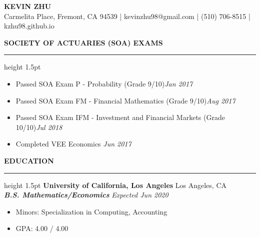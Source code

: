 \documentclass[11pt,letterpaper]{article}
\newcommand{\sectline}{\vspace{3pt}\hrule height 1.5pt\vspace{3pt}}
\newcommand{\sectspace}{\vspace{7pt}}
\begin{document}
\centering
{\fontsize{13pt}{13pt}\selectfont \textbf{KEVIN ZHU}} \vspace{2pt} \\
{\fontsize{11pt}{13pt} Carmelita Place, Fremont, CA 94539 | kevinzhu98@gmail.com | (510) 706-8515 | kzhu98.github.io}
\sectspace

\fontsize{11pt}{13pt}\selectfont
\raggedright
\textbf{SOCIETY OF ACTUARIES (SOA) EXAMS}\sectline
\begin{itemize}
	\item Passed SOA Exam P - Probability (Grade 9/10)\hfill \textit{Jan 2017}
	\item Passed SOA Exam FM - Financial Mathematics (Grade 9/10)\hfill \textit{Aug 2017}
	\item Passed SOA Exam IFM - Investment and Financial Markets (Grade 10/10)\hfill \textit{Jul 2018}
	\item Completed VEE Economics \hfill \textit{Jun 2017}
\end{itemize}
\sectspace


\textbf{EDUCATION}\sectline
\textbf{University of California, Los Angeles} \hfill Los Angeles, CA \\
\textbf{\textit{B.S. Mathematics/Economics}} \hfill \textit{Expected Jun 2020}
\begin{itemize}
	\item Minors: Specialization in Computing, Accounting
	\item GPA: 4.00 / 4.00
\end{itemize}
\sectspace
\end{document}
